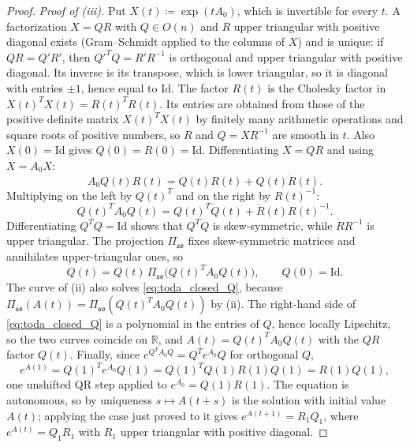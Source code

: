 \documentclass[11pt,a4paper,reqno]{amsart}
\theoremstyle{definition}
\numberwithin{equation}{section}
\providecommand{\R}{\mathbb{R}}
\newcommand{\Id}{\mathrm{Id}}
\providecommand{\R}{\mathbb{R}}
\begin{document}
\begin{proof}
\emph{Proof of (iii).} Put $X(t) \coloneqq \exp(t A_0)$, which is invertible for every $t$. A factorization $X = QR$ with $Q \in O(n)$ and $R$ upper triangular with positive diagonal exists (Gram--Schmidt applied to the columns of $X$) and is unique: if $QR = Q'R'$, then $Q'^T Q = R' R^{-1}$ is orthogonal and upper triangular with positive diagonal. Its inverse is its transpose, which is lower triangular, so it is diagonal with entries $\pm 1$, hence equal to $\Id$. The factor $R(t)$ is the Cholesky factor in $X(t)^T X(t) = R(t)^T R(t)$. Its entries are obtained from those of the positive definite matrix $X(t)^T X(t)$ by finitely many arithmetic operations and square roots of positive numbers, so $R$ and $Q = X R^{-1}$ are smooth in $t$. Also $X(0) = \Id$ gives $Q(0) = R(0) = \Id$. Differentiating $X = QR$ and using $\dot X = A_0 X$:
\begin{equation}
    A_0 Q(t) R(t) = \dot{Q}(t) R(t) + Q(t) \dot{R}(t).
\end{equation}
Multiplying on the left by $Q(t)^T$ and on the right by $R(t)^{-1}$:
\begin{equation}
    Q(t)^T A_0 Q(t) = Q(t)^T \dot{Q}(t) + \dot{R}(t) R(t)^{-1}.
\end{equation}
Differentiating $Q^T Q = \Id$ shows that $Q^T \dot{Q}$ is skew-symmetric, while $\dot{R} R^{-1}$ is upper triangular. The projection $\Pi_{\mathfrak{so}}$ fixes skew-symmetric matrices and annihilates upper-triangular ones, so
\begin{equation}
    \label{eq:toda_closed_Q}
    \dot{Q}(t) = Q(t)\, \Pi_{\mathfrak{so}}\big(Q(t)^T A_0 Q(t)\big), \qquad Q(0) = \Id.
\end{equation}
The curve of (ii) also solves \eqref{eq:toda_closed_Q}, because $\Pi_{\mathfrak{so}}(A(t)) = \Pi_{\mathfrak{so}}(Q(t)^T A_0 Q(t))$ by (ii). The right-hand side of \eqref{eq:toda_closed_Q} is a polynomial in the entries of $Q$, hence locally Lipschitz, so the two curves coincide on $\R$, and $A(t) = Q(t)^T A_0 Q(t)$ with the $QR$ factor $Q(t)$. Finally, since $e^{Q^T A_0 Q} = Q^T e^{A_0} Q$ for orthogonal $Q$,
\begin{equation}
    e^{A(1)} = Q(1)^T e^{A_0} Q(1) = Q(1)^T Q(1) R(1) Q(1) = R(1) Q(1),
\end{equation}
one unshifted QR step applied to $e^{A_0} = Q(1)R(1)$. The equation is autonomous, so by uniqueness $s \mapsto A(t+s)$ is the solution with initial value $A(t)$; applying the case just proved to it gives $e^{A(t+1)} = R_1 Q_1$, where $e^{A(t)} = Q_1 R_1$ with $R_1$ upper triangular with positive diagonal.
\end{proof}
\end{document}
